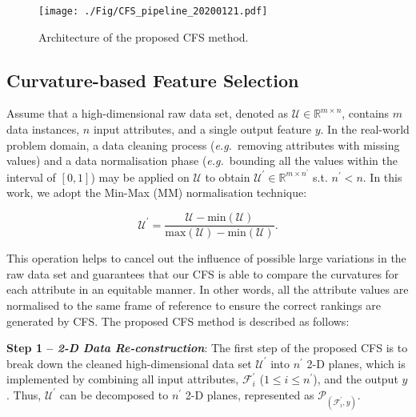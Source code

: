 \documentclass{article}
\newcommand{\zzeg}{\emph{e.g.}~}
\newcommand*{\1}{\textcolor{magenta}}
\begin{document}
	\begin{figure*}[ht]
		\centering
		\texttt{[image: ./Fig/CFS\_pipeline\_20200121.pdf]}
		\caption{Architecture of the proposed CFS method.}\label{fig:pip}
	\end{figure*}
	
	\subsection{Curvature-based Feature Selection}\label{sec:CFS}
	Assume that a high-dimensional raw data set, denoted as $\mathcal{U} \in \mathbb{R}^{m \times n}$, contains $m$ data instances, $n$ input attributes, and a single output feature $y$. In the real-world problem domain, a data cleaning process (\zzeg removing attributes with missing values) and a data normalisation phase (\zzeg bounding all the values within the interval of $[0,1]$) may be applied on $\mathcal{U}$ to obtain $\mathcal{U}^{'} \in \mathbb{R}^{m \times n^{'}}$ s.t. $n^{'} < n$. In this work, we adopt the Min-Max (MM) normalisation technique:
	
	\begin{equation}
		\mathcal{U}^{'} = \frac{\mathcal{U} - \textrm{min}(\mathcal{U})}{\textrm{max}(\mathcal{U})-\textrm{min}(\mathcal{U})}.
	\end{equation}

	This operation helps to cancel out the influence of possible large variations in the raw data set and guarantees that our CFS is able to compare the curvatures for each attribute in an equitable manner. In other words, all the attribute values are normalised to the same frame of reference to ensure the correct rankings are generated by CFS. The proposed CFS method is described as follows:


	\textbf{Step 1 -- \textit{2-D Data Re-construction}}: The first step of the proposed CFS is to break down the cleaned high-dimensional data set $\mathcal{U}^{'}$ into $n^{'}$ 2-D planes, which is implemented by combining all input attributes, $\mathcal{F}_i^{'}$ ($ 1\leqslant i \leqslant n^{'}$), and the output $y$. Thus, $\mathcal{U}^{'}$ can be decomposed to $n^{'}$ 2-D planes, represented as $\mathcal{P}_{(\mathcal{F}_i^{'},y)}$. 
	
\end{document}
